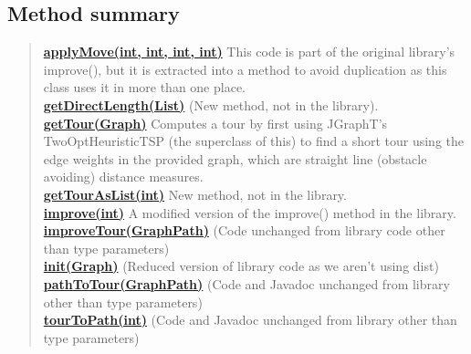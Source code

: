 \documentclass[11pt,a4paper]{report}
\begin{document}
{{{{{{{{{{{\subsection{Method summary}{
\begin{verse}
\hyperlink{uk.ac.ed.inf.aqmaps.flightplanning.EnhancedTwoOptTSP.applyMove(int[], int[], int, int)}{{\bf applyMove(int\lbrack \rbrack , int\lbrack \rbrack , int, int)}} This code is part of the original library's improve(), but it is extracted into a method to avoid duplication as this class uses it in more than one place.\\
\hyperlink{uk.ac.ed.inf.aqmaps.flightplanning.EnhancedTwoOptTSP.getDirectLength(java.util.List)}{{\bf getDirectLength(List)}} (New method, not in the library).\\
\hyperlink{uk.ac.ed.inf.aqmaps.flightplanning.EnhancedTwoOptTSP.getTour(org.jgrapht.Graph)}{{\bf getTour(Graph)}} Computes a tour by first using JGraphT's TwoOptHeuristicTSP (the superclass of this) to find a short tour using the edge weights in the provided graph, which are straight line (obstacle avoiding) distance measures.\\
\hyperlink{uk.ac.ed.inf.aqmaps.flightplanning.EnhancedTwoOptTSP.getTourAsList(int[])}{{\bf getTourAsList(int\lbrack \rbrack )}} New method, not in the library.\\
\hyperlink{uk.ac.ed.inf.aqmaps.flightplanning.EnhancedTwoOptTSP.improve(int[])}{{\bf improve(int\lbrack \rbrack )}} A modified version of the improve() method in the library.\\
\hyperlink{uk.ac.ed.inf.aqmaps.flightplanning.EnhancedTwoOptTSP.improveTour(org.jgrapht.GraphPath)}{{\bf improveTour(GraphPath)}} (Code unchanged from library code other than type parameters)\\
\hyperlink{uk.ac.ed.inf.aqmaps.flightplanning.EnhancedTwoOptTSP.init(org.jgrapht.Graph)}{{\bf init(Graph)}} (Reduced version of library code as we aren't using dist\lbrack \rbrack \lbrack \rbrack )\\
\hyperlink{uk.ac.ed.inf.aqmaps.flightplanning.EnhancedTwoOptTSP.pathToTour(org.jgrapht.GraphPath)}{{\bf pathToTour(GraphPath)}} (Code and Javadoc unchanged from library other than type parameters)\\
\hyperlink{uk.ac.ed.inf.aqmaps.flightplanning.EnhancedTwoOptTSP.tourToPath(int[])}{{\bf tourToPath(int\lbrack \rbrack )}} (Code and Javadoc unchanged from library other than type parameters)\\
\end{verse}
}
}}}}}}}}}}}
\end{document}
